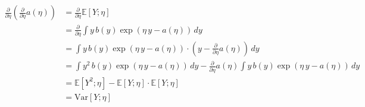 \begin{answer}
\begin{align*}
    \frac{\partial}{\partial\eta}\left(\frac{\partial}{\partial\eta}a(\eta)\right) &= \frac{\partial}{\partial\eta} \mathbb{E}[Y;\eta] \\
    &= \frac{\partial}{\partial\eta} \int y\,b(y)\exp(\eta\,y - a(\eta))\,dy \\
    &= \int y\,b(y)\exp(\eta\,y - a(\eta))\cdot \left(y - \frac{\partial}{\partial\eta}a(\eta)\right)\,dy \\
    &= \int y^2\,b(y)\exp(\eta\,y - a(\eta))\,dy - \frac{\partial}{\partial\eta}a(\eta)\int y\,b(y)\exp(\eta\,y - a(\eta))\,dy \\
    &= \mathbb{E}[Y^2;\eta] - \mathbb{E}[Y;\eta]\cdot\mathbb{E}[Y;\eta] \\
    &= \textrm{Var}[Y;\eta]
\end{align*}
\end{answer}
